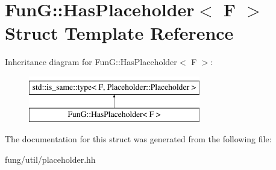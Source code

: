 \hypertarget{structFunG_1_1HasPlaceholder}{\section{Fun\-G\-:\-:Has\-Placeholder$<$ F $>$ Struct Template Reference}
\label{structFunG_1_1HasPlaceholder}
}
Inheritance diagram for Fun\-G\-:\-:Has\-Placeholder$<$ F $>$\-:\begin{figure}[H]
\begin{center}
\leavevmode
\includegraphics[height=2.000000cm]{structFunG_1_1HasPlaceholder}
\end{center}
\end{figure}


The documentation for this struct was generated from the following file\-:\begin{DoxyCompactItemize}
\item 
fung/util/placeholder.\-hh\end{DoxyCompactItemize}
